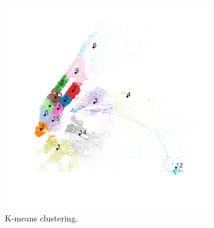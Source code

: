 \documentclass[twocolumn,10pt]{article}
\begin{document}
\begin{figure}
\centering
\includegraphics[width=90mm]{kMeansClusters}
\caption{K-means clustering.}
\label{fig:Clusters}
\end{figure}
\end{document}
